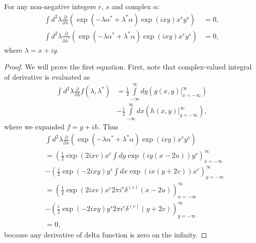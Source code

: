 \begin{lemma}
\label{lmm:c-numbers:zero-integrals}
	For any non-negative integers $r$, $s$ and complex $\alpha$:
	\begin{equation*}
	\begin{split}
		\int d^2\lambda
			\frac{\partial}{\partial \lambda} \left(
				\exp(-\lambda \alpha^* + \lambda^* \alpha)
				\exp(ixy) x^r y^s
			\right)
		& = 0, \\
		\int d^2\lambda
			\frac{\partial}{\partial \lambda^*}
			\left(
				\exp(-\lambda \alpha^* + \lambda^* \alpha)
				\exp(ixy) x^r y^s
			\right)
		& = 0,
	\end{split}
	\end{equation*}
	where $\lambda = x + iy$.
\end{lemma}
\begin{proof}
We will prove the first equation.
First, note that complex-valued integral of derivative is evaluated as
\begin{equation*}
\begin{split}
	\int d^2\lambda \frac{\partial}{\partial \lambda} f(\lambda, \lambda^*)
	& =	\frac{1}{2} \int\limits_{-\infty}^{\infty} dy \left(
			\left. g(x, y) \right|_{x=-\infty}^{\infty}
		\right) \\
	& - \frac{i}{2} \int\limits_{-\infty}^{\infty} dx \left(
			\left. h(x, y) \right|_{y=-\infty}^{\infty}
		\right),
\end{split}
\end{equation*}
where we expanded $f = g + ih$.
Thus
\begin{equation*}
\begin{split}
	& \int d^2\lambda
		\frac{\partial}{\partial \lambda} \left(
			\exp(-\lambda \alpha^* + \lambda^* \alpha)
			\exp(ixy) x^r y^s
		\right) \\
	& = \left(
			\frac{1}{2} \exp(2ixv) x^r \int dy \exp(iy(x-2u)) y^s
		\right)_{x = -\infty}^\infty \\
	& - \left(
			\frac{i}{2} \exp(-2ixy) y^s \int dx \exp(ix(y+2v)) x^r
		\right)_{y = -\infty}^\infty \\
	& = \left(
			\frac{1}{2} \exp(2ixv) x^r 2 \pi i^s \delta^{(s)}(x-2u)
		\right)_{x = -\infty}^\infty \\
	& - \left(
			\frac{i}{2} \exp(-2ixy) y^s 2 \pi i^r \delta^{(r)}(y+2v)
		\right)_{y = -\infty}^\infty \\
	& = 0,
\end{split}
\end{equation*}
because any derivative of delta function is zero on the infinity.
\end{proof}
